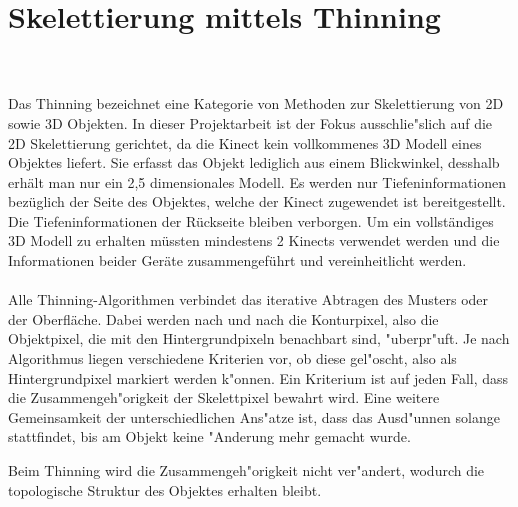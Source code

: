 \section{Skelettierung mittels Thinning}
\\ \\
Das Thinning bezeichnet eine Kategorie von Methoden zur Skelettierung von 2D sowie 3D Objekten. In dieser Projektarbeit ist der Fokus ausschlie"slich auf die 2D Skelettierung gerichtet, da die Kinect kein vollkommenes 3D Modell eines Objektes liefert. Sie erfasst das Objekt lediglich aus einem Blickwinkel, desshalb erhält man nur ein 2,5 dimensionales Modell. Es werden nur Tiefeninformationen bezüglich der Seite des Objektes, welche der Kinect zugewendet ist bereitgestellt. Die  Tiefeninformationen der Rückseite bleiben verborgen. Um ein vollständiges 3D Modell zu erhalten müssten mindestens 2 Kinects verwendet werden und die Informationen beider Geräte zusammengeführt und vereinheitlicht werden. \\ \\
Alle Thinning-Algorithmen verbindet das iterative Abtragen des Musters oder der Oberfläche. Dabei werden nach und nach die Konturpixel, also die Objektpixel, die mit den Hintergrundpixeln benachbart sind, "uberpr"uft. Je nach Algorithmus liegen verschiedene Kriterien vor, ob diese gel"oscht, also als Hintergrundpixel markiert werden k"onnen. Ein Kriterium ist auf jeden Fall, dass die Zusammengeh"origkeit der Skelettpixel bewahrt wird. Eine weitere Gemeinsamkeit der unterschiedlichen Ans"atze ist, dass das Ausd"unnen solange stattfindet, bis am Objekt keine "Anderung mehr gemacht wurde.

Beim Thinning wird die Zusammengeh"origkeit nicht ver"andert, wodurch die topologische Struktur des Objektes erhalten bleibt. 

